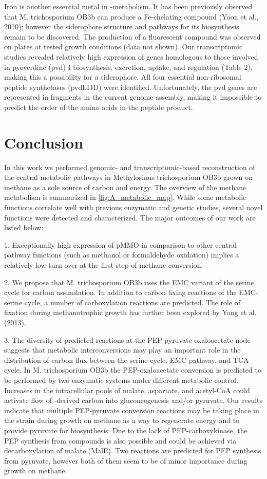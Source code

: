 Iron is another essential metal in -metabolism.
It has been previously observed that M. trichosporium OB3b can produce a Fe-chelating compound (Yoon et al., 2010); however the siderophore structure and pathways for its biosynthesis remain to be discovered.
The production of a fluorescent compound was observed on plates at tested growth conditions (data not shown).
Our transcriptomic studies revealed relatively high expression of genes homologous to those involved in pyoverdine (pvd) I biosynthesis, excretion, uptake, and regulation (Table 2), making this a possibility for a siderophore.
All four essential non-ribosomal peptide synthetases (pvdLIJD) were identified.
Unfortunately, the pvd genes are represented in fragments in the current genome assembly, making it impossible to predict the order of the amino acids in the peptide product.

\section{Conclusion}

In this work we performed genomic- and transcriptomic-based reconstruction of the central metabolic pathways in Methylosinus trichosporium OB3b grown on methane as a sole source of carbon and energy.
The overview of the methane metabolism is summarized in \ref{fig:A_metabolic_map}.
While some metabolic functions correlate well with previous enzymatic and genetic studies, several novel functions were detected and characterized.
The major outcomes of our work are listed below:

1. Exceptionally high expression of pMMO in comparison to other central pathway functions (such as methanol or formaldehyde oxidation) implies a relatively low turn over at the first step of methane conversion.

2. We propose that M. trichosporium OB3b uses the EMC variant of the serine cycle for carbon assimilation.
In addition to carbon fixing reactions of the EMC-serine cycle, a number of carboxylation reactions are predicted.
The role of  fixation during methanotrophic growth has further been explored by Yang et al. (2013).

3. The diversity of predicted reactions at the PEP-pyruvate-oxaloacetate node suggests that metabolic interconversions may play an important role in the distribution of carbon flux between the serine cycle, EMC pathway, and TCA cycle.
In M. trichosporium OB3b the PEP-oxaloacetate conversion is predicted to be performed by two enzymatic systems under different metabolic control.
Increases in the intracellular pools of malate, aspartate, and acetyl-CoA could activate flow of -derived carbon into gluconeogenesis and/or pyruvate.
Our results indicate that multiple PEP-pyruvate conversion reactions may be taking place in the strain during growth on methane as a way to regenerate energy and to provide pyruvate for biosynthesis.
Due to the lack of PEP-carboxykinase, the PEP synthesis from  compounds is also possible and could be achieved via decarboxylation of malate (MalE).
Two reactions are predicted for PEP synthesis from pyruvate, however both of them seem to be of minor importance during growth on methane.

